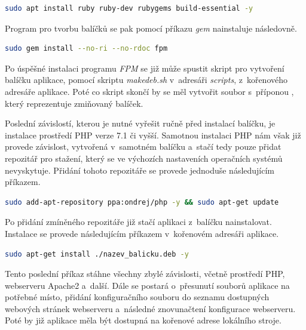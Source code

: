 \documentclass[thesis=M,czech]{FITthesis}[2012/06/26]
\begin{document}
\begin{lstlisting}[language=bash,identifierstyle=\color{black}]
sudo apt install ruby ruby-dev rubygems build-essential -y
\end{lstlisting}

Program pro tvorbu balíčků se pak pomocí příkazu \textit{gem} nainstaluje následovně.\\

\begin{lstlisting}[language=bash,identifierstyle=\color{black}]
sudo gem install --no-ri --no-rdoc fpm
\end{lstlisting}

Po úspěšné instalaci programu \textit{FPM} se již může spustit skript pro vytvoření balíčku aplikace, pomocí skriptu \textit{makedeb.sh} v~adresáři \textit{scripts}, z~kořenového adresáře aplikace. Poté co skript skončí by se měl vytvořit soubor s~příponou , který reprezentuje zmiňovaný balíček.

Poslední závislostí, kterou je nutné vyřešit ručně před instalací balíčku, je instalace prostředí PHP verze 7.1 či vyšší. Samotnou instalaci PHP nám však již provede závislost, vytvořená v~samotném balíčku a~stačí tedy pouze přidat repozitář pro stažení, který se ve výchozích nastaveních operačních systémů nevyskytuje. Přidání tohoto repozitáře se provede jednoduše následujícím příkazem.\\

\begin{lstlisting}[language=bash,identifierstyle=\color{black}]
sudo add-apt-repository ppa:ondrej/php -y && sudo apt-get update
\end{lstlisting}

Po přidání zmíněného repozitáře již stačí aplikaci z~balíčku nainstalovat. Instalace se provede následujícím příkazem v~kořenovém adresáři aplikace.\\

\begin{lstlisting}[language=bash,identifierstyle=\color{black}]
sudo apt-get install ./nazev_balicku.deb -y
\end{lstlisting}

Tento poslední příkaz stáhne všechny zbylé závislosti, včetně prostředí PHP, webserveru Apache2 a~další. Dále se postará o~přesunutí souborů aplikace na potřebné místo, přidání konfiguračního souboru do seznamu dostupných webových stránek webserveru a~následné znovunačtení konfigurace webserveru. Poté by již aplikace měla být dostupná na kořenové adrese lokálního stroje.
\end{document}
